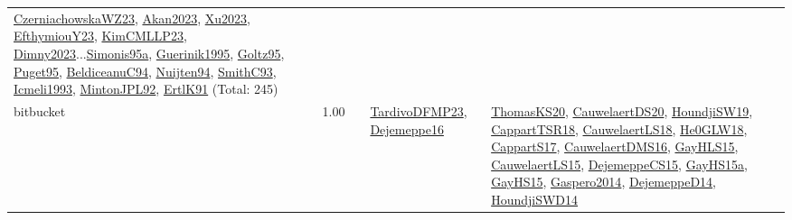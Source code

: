 {\begin{longtable}{p{3cm}r>{\raggedright\arraybackslash}p{6cm}>{\raggedright\arraybackslash}p{6cm}>{\raggedright\arraybackslash}p{8cm}}
\hyperref[detail:CzerniachowskaWZ23]{CzerniachowskaWZ23}, \hyperref[detail:Akan2023]{Akan2023}, \hyperref[detail:Xu2023]{Xu2023}, \hyperref[detail:EfthymiouY23]{EfthymiouY23}, \hyperref[detail:KimCMLLP23]{KimCMLLP23}, \hyperref[detail:Dimny2023]{Dimny2023}...\hyperref[detail:Simonis95a]{Simonis95a}, \hyperref[detail:Guerinik1995]{Guerinik1995}, \hyperref[detail:Goltz95]{Goltz95}, \hyperref[detail:Puget95]{Puget95}, \hyperref[detail:BeldiceanuC94]{BeldiceanuC94}, \hyperref[detail:Nuijten94]{Nuijten94}, \hyperref[detail:SmithC93]{SmithC93}, \hyperref[detail:Icmeli1993]{Icmeli1993}, \hyperref[detail:MintonJPL92]{MintonJPL92}, \hyperref[detail:ErtlK91]{ErtlK91} (Total: 245)\\
\index{bitbucket}\index{Benchmarks!bitbucket}bitbucket &  1.00 &  & \hyperref[detail:TardivoDFMP23]{TardivoDFMP23}, \hyperref[detail:Dejemeppe16]{Dejemeppe16} & \hyperref[detail:ThomasKS20]{ThomasKS20}, \hyperref[detail:CauwelaertDS20]{CauwelaertDS20}, \hyperref[detail:HoundjiSW19]{HoundjiSW19}, \hyperref[detail:CappartTSR18]{CappartTSR18}, \hyperref[detail:CauwelaertLS18]{CauwelaertLS18}, \hyperref[detail:He0GLW18]{He0GLW18}, \hyperref[detail:CappartS17]{CappartS17}, \hyperref[detail:CauwelaertDMS16]{CauwelaertDMS16}, \hyperref[detail:GayHLS15]{GayHLS15}, \hyperref[detail:CauwelaertLS15]{CauwelaertLS15}, \hyperref[detail:DejemeppeCS15]{DejemeppeCS15}, \hyperref[detail:GayHS15a]{GayHS15a}, \hyperref[detail:GayHS15]{GayHS15}, \hyperref[detail:Gaspero2014]{Gaspero2014}, \hyperref[detail:DejemeppeD14]{DejemeppeD14}, \hyperref[detail:HoundjiSWD14]{HoundjiSWD14}\\

\end{longtable}}
